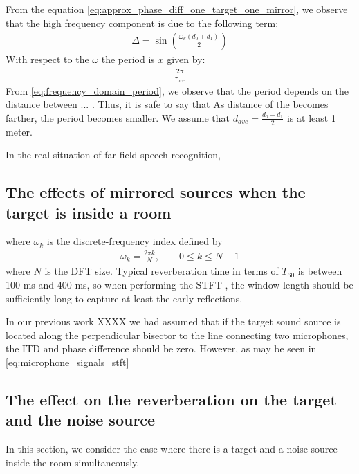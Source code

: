 \documentclass[journal]{IEEEtran}
\begin{document}
%
From the equation \eqref{eq:approx_phase_diff_one_target_one_mirror}, we observe
that the high frequency component is due to the following term: 
\begin{align}
  \Delta = \sin \left( \frac{\omega_k \left(d_0 + d_1\right)}{2} \right)
\end{align}
With respect to the $\omega$ the period is $x$ given by:
\begin{align}
  \frac{2 \pi}{\tau_{ave}} \label{eq:frequency_domain_period}
\end{align}
From \eqref{eq:frequency_domain_period}, we observe that the period depends on the 
distance between ... . Thus, it is safe to say that 
As distance of the becomes farther, the period becomes smaller.
We assume that $d_{ave}  = \frac{d_0 - d_1}{2}$ is at least 1 meter.

In the real situation of far-field speech recognition, 

\subsection{The effects of mirrored sources when the target is inside a room}



where $\omega_k$ is the discrete-frequency index defined by
\begin{align}
  \omega_k = \frac{2 \pi k}{N}, \qquad 0 \le k \le N - 1
\end{align}
where $N$ is the DFT size. Typical reverberation time in terms of
$T_{60}$ is between 100 ms and 400 ms, so when performing the STFT
, the window length should be sufficiently long to capture at least 
the early reflections.

In our previous work XXXX we had assumed that if the target 
sound source is located along the perpendicular bisector to the
line connecting two microphones, the ITD and phase difference
should be zero. However, as may be seen in \eqref{eq:microphone_signals_stft}
  

\subsection{The effect on the reverberation on the target and the noise source}

In this section, we consider the case where there is a target and 
a noise source inside the room simultaneously. 


%
\end{document}
